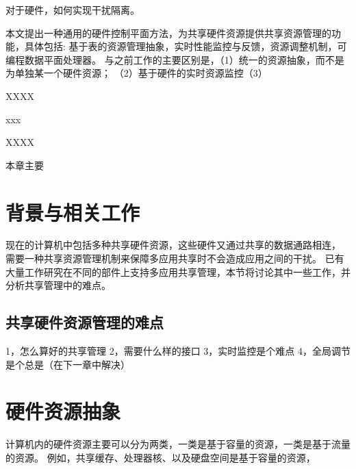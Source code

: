 对于硬件，如何实现干扰隔离。 %

本文提出一种通用的硬件控制平面方法，为共享硬件资源提供共享资源管理的功能，具体包括:
基于表的资源管理抽象，实时性能监控与反馈，资源调整机制，可编程数据平面处理器。
与之前工作的主要区别是，（1）统一的资源抽象，而不是为单独某一个硬件资源；
（2）基于硬件的实时资源监控（3）

XXXX

xxx

XXXX

本章主要




\section{背景与相关工作}

现在的计算机中包括多种共享硬件资源，这些硬件又通过共享的数据通路相连，
需要一种共享资源管理机制来保障多应用共享时不会造成应用之间的干扰。
已有大量工作研究在不同的部件上支持多应用共享管理，本节将讨论其中一些工作，并分析共享管理中的难点。


\subsection{共享硬件资源管理的难点}
1，怎么算好的共享管理
2，需要什么样的接口
3，实时监控是个难点
4，全局调节是个总是（在下一章中解决）

\section{硬件资源抽象}

计算机内的硬件资源主要可以分为两类，一类是基于容量的资源，一类是基于流量的资源。
例如，共享缓存、处理器核、以及硬盘空间是基于容量的资源，


